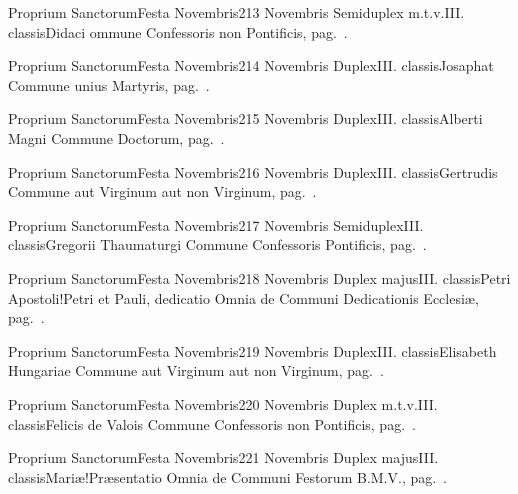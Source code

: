 \documentclass[nocturnale-romanum.tex]{subfiles}
\begin{document}
	{Proprium Sanctorum}{Festa Novembris}{2}{13 Novembris}
	{Semiduplex m.t.v.}{III. classis}{Didaci}
	{ommune Confessoris non Pontificis, pag.\ \pageref{M-CONP}.}
	{}

	{Proprium Sanctorum}{Festa Novembris}{2}{14 Novembris}
	{Duplex}{III. classis}{Josaphat}
	{Commune unius Martyris, pag.\ \pageref{M-UMEX}.}
	{}

	{Proprium Sanctorum}{Festa Novembris}{2}{15 Novembris}
	{Duplex}{III. classis}{Alberti Magni}
	{Commune Doctorum, pag.\ \pageref{M-CODO}.}
	{}

	{Proprium Sanctorum}{Festa Novembris}{2}{16 Novembris}
	{Duplex}{III. classis}{Gertrudis}
	{Commune aut Virginum aut non Virginum, pag.\ \pageref{M-MU}.}
	{}

	{Proprium Sanctorum}{Festa Novembris}{2}{17 Novembris}
	{Semiduplex}{III. classis}{Gregorii Thaumaturgi}
	{Commune Confessoris Pontificis, pag.\ \pageref{M-COPO}.}
	{}

	{Proprium Sanctorum}{Festa Novembris}{2}{18 Novembris}
	{Duplex majus}{III. classis}{Petri Apostoli!Petri et Pauli, dedicatio}
	{Omnia de Communi Dedicationis Ecclesiæ, pag.\ \pageref{M-CDED}.}
	{}

	{Proprium Sanctorum}{Festa Novembris}{2}{19 Novembris}
	{Duplex}{III. classis}{Elisabeth Hungariae}
	{Commune aut Virginum aut non Virginum, pag.\ \pageref{M-MU}.}
	{}

	{Proprium Sanctorum}{Festa Novembris}{2}{20 Novembris}
	{Duplex m.t.v.}{III. classis}{Felicis de Valois}
	{Commune Confessoris non Pontificis, pag.\ \pageref{M-CONP}.}
	{}

	{Proprium Sanctorum}{Festa Novembris}{2}{21 Novembris}
	{Duplex majus}{III. classis}{Mariæ!Præsentatio}
	{Omnia de Communi Festorum B.M.V., pag.\ \pageref{M-CBMV}.}
	{}
\end{document}
